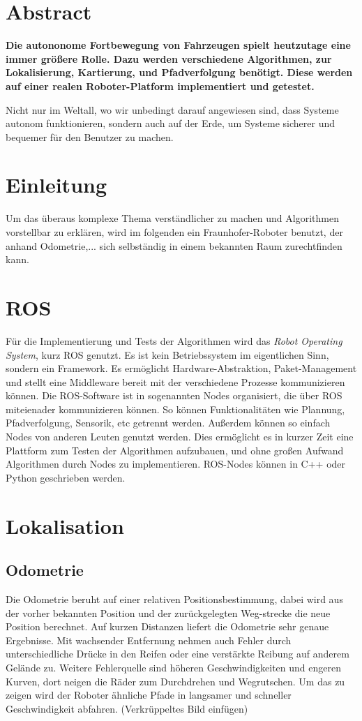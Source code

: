 \documentclass[11pt,a4paper]{article}
\begin{document}
\section*{Abstract}
{
\textbf{Die autononome Fortbewegung von Fahrzeugen spielt heutzutage eine immer gr\"o\ss{}ere Rolle. Dazu werden verschiedene Algorithmen, zur Lokalisierung, Kartierung, und Pfadverfolgung ben\"otigt. Diese werden auf einer realen Roboter-Platform implementiert und getestet.}

Nicht nur im Weltall, wo wir unbedingt darauf angewiesen sind, dass Systeme autonom funktionieren, sondern auch auf der Erde, um Systeme sicherer und bequemer f\"ur den Benutzer zu machen. 


\section{Einleitung}
Um das überaus komplexe Thema verst\"andlicher zu machen und Algorithmen vorstellbar zu erkl\"aren, wird im folgenden ein Fraunhofer-Roboter benutzt, der anhand Odometrie,... sich selbst\"andig in einem bekannten Raum zurechtfinden kann.

\section{ROS}
F\"ur die Implementierung und Tests der Algorithmen wird das \textit{Robot Operating System}, kurz ROS genutzt. Es ist kein Betriebssystem im eigentlichen Sinn, sondern ein Framework. Es erm\"oglicht Hardware-Abstraktion, Paket-Management und stellt eine Middleware bereit mit der verschiedene Prozesse kommunizieren k\"onnen. \cite{rosWiki}
Die ROS-Software ist in sogenannten Nodes organisiert, die \"uber ROS miteienader kommunizieren k\"onnen. So k\"onnen Funktionalit\"aten wie Plannung, Pfadverfolgung, Sensorik, etc getrennt werden. Au{\ss}erdem k\"onnen so einfach Nodes von anderen Leuten genutzt werden. Dies erm\"oglicht es in kurzer Zeit eine Plattform zum Testen der Algorithmen aufzubauen, und ohne gro{\ss}en Aufwand Algorithmen durch Nodes zu implementieren. ROS-Nodes k\"onnen in C++ oder Python geschrieben werden. 
 

\section{Lokalisation}
\subsection{Odometrie}
{Die Odometrie beruht auf einer relativen Positionsbestimmung, dabei wird aus der vorher bekannten Position und der zur\"uckgelegten Weg-strecke die neue Position berechnet. Auf kurzen Distanzen liefert die Odometrie sehr genaue Ergebnisse. Mit wachsender Entfernung nehmen auch Fehler durch unterschiedliche Dr\"ucke in den Reifen oder eine verst\"arkte Reibung auf anderem Gel\"ande zu. Weitere Fehlerquelle sind h\"oheren Geschwindigkeiten und engeren Kurven, dort neigen die R\"ader zum Durchdrehen und Wegrutschen. Um das zu zeigen wird der Roboter \"ahnliche Pfade in langsamer und schneller Geschwindigkeit abfahren. 
	(Verkrüppeltes Bild einfügen)
	
}}
\end{document}
